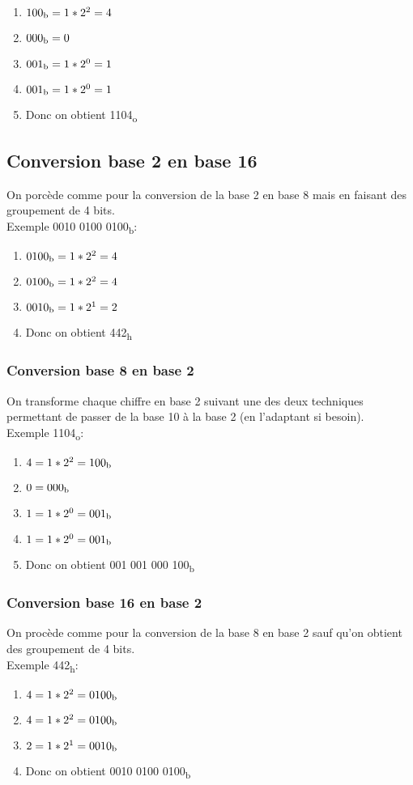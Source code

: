 \documentclass[10pt,a4paper]{article}
\begin{document}
 \begin{enumerate}
	 \item $100\textsubscript{b} = 1*2^2 = 4$
	 \item $000\textsubscript{b} = 0$
	 \item $001\textsubscript{b} = 1*2^0 = 1$
	 \item $001\textsubscript{b} = 1*2^0 = 1$
	 \item Donc on obtient 1104\textsubscript{o}
 \end{enumerate}

 \subsection{Conversion base 2 en base 16}
 On porcède comme pour la conversion de la base 2 en base 8 mais en faisant des groupement de 4 bits.\\
 Exemple 0010 0100 0100\textsubscript{b}:
 \begin{enumerate}
	 \item $0100\textsubscript{b} = 1*2^2 = 4$
	 \item $0100\textsubscript{b} = 1*2^2 = 4$
	 \item $0010\textsubscript{b} = 1*2^1 = 2$
	 \item Donc on obtient 442\textsubscript{h}
 \end{enumerate}

 \subsubsection{Conversion base 8 en base 2}
 On transforme chaque chiffre en base 2 suivant une des deux techniques permettant de passer de la base 10 à la base 2 (en l'adaptant si besoin).\\
 Exemple 1104\textsubscript{o}:
 \begin{enumerate}
	 \item $4 = 1*2^2 = 100\textsubscript{b}$
	 \item $0 = 000\textsubscript{b}$
	 \item $1 = 1*2^0 = 001\textsubscript{b}$
	 \item $1 = 1*2^0 = 001\textsubscript{b}$
	 \item Donc on obtient 001 001 000 100\textsubscript{b}
 \end{enumerate}

 \subsubsection{Conversion base 16 en base 2}
 On procède comme pour la conversion de la base 8 en base 2 sauf qu'on obtient des groupement de 4 bits.\\
 Exemple 442\textsubscript{h}:
\begin{enumerate}
	 \item $4 = 1*2^2 = 0100\textsubscript{b}$
	 \item $4 = 1*2^2 = 0100\textsubscript{b}$
	 \item $2 = 1*2^1 = 0010\textsubscript{b}$
	 \item Donc on obtient 0010 0100 0100\textsubscript{b}
 \end{enumerate}
\end{document}
